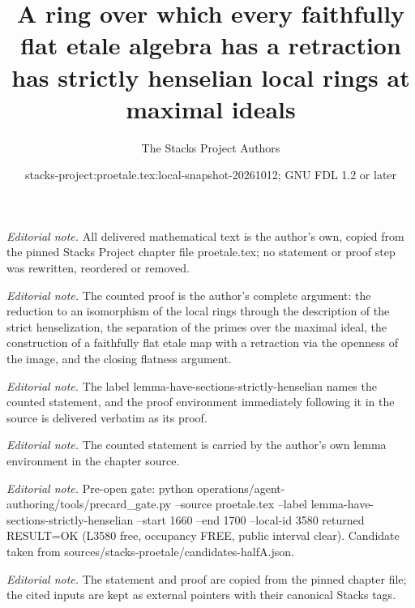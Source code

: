 \documentclass[10pt,a4paper]{amsart}
\title{A ring over which every faithfully flat etale algebra has a retraction has strictly henselian local rings at maximal ideals}
\author{The Stacks Project Authors}
\date{stacks-project:proetale.tex:local-snapshot-20261012; GNU FDL 1.2 or later}
\theoremstyle{plain}
\theoremstyle{definition}
\theoremstyle{remark}
\numberwithin{equation}{subsection}
\begin{document}
\maketitle
\noindent\textit{Editorial note.} All delivered mathematical text is the author's own, copied from the pinned Stacks Project chapter file proetale.tex; no statement or proof step was rewritten, reordered or removed.\par\medskip
\noindent\textit{Editorial note.} The counted proof is the author's complete argument: the reduction to an isomorphism of the local rings through the description of the strict henselization, the separation of the primes over the maximal ideal, the construction of a faithfully flat etale map with a retraction via the openness of the image, and the closing flatness argument.\par\medskip
\noindent\textit{Editorial note.} The label lemma-have-sections-strictly-henselian names the counted statement, and the proof environment immediately following it in the source is delivered verbatim as its proof.\par\medskip
\noindent\textit{Editorial note.} The counted statement is carried by the author's own lemma environment in the chapter source.\par\medskip
\noindent\textit{Editorial note.} Pre-open gate: python operations/agent-authoring/tools/precard\_gate.py --source proetale.tex --label lemma-have-sections-strictly-henselian --start 1660 --end 1700 --local-id 3580 returned RESULT=OK (L3580 free, occupancy FREE, public interval clear). Candidate taken from sources/stacks-proetale/candidates-halfA.json.\par\medskip
\noindent\textit{Editorial note.} The statement and proof are copied from the pinned chapter file; the cited inputs are kept as external pointers with their canonical Stacks tags.\par\medskip
\end{document}
